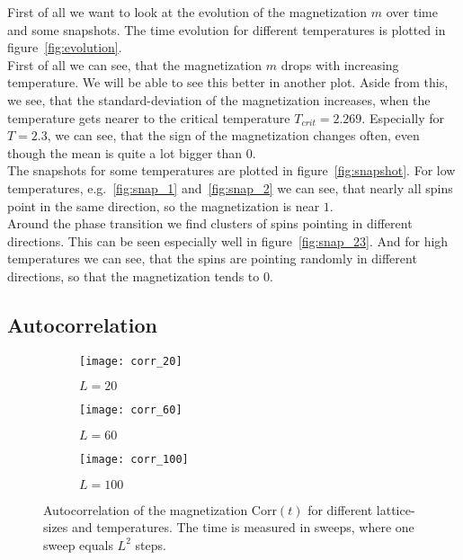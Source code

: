 First of all we want to look at the evolution of the magnetization $m$ over time and some snapshots. The time evolution for different temperatures is plotted in figure~\ref{fig:evolution}.\\
First of all we can see, that the magnetization $m$ drops with increasing temperature. We will be able to see this better in another plot. Aside from this, we see, that the standard-deviation of the magnetization increases, when the temperature gets nearer to the critical temperature $T_{crit} = 2.269$. Especially for $T = 2.3$, we can see, that the sign of the magnetization changes often, even though the mean is quite a lot bigger than $0$.\\
The snapshots for some temperatures are plotted in figure~\ref{fig:snapshot}. For low temperatures, e.g.~\ref{fig:snap_1} and~\ref{fig:snap_2} we can see, that nearly all spins point in the same direction, so the magnetization is near $1$.\\
Around the phase transition we find clusters of spins pointing in different directions. This can be seen especially well in figure~\ref{fig:snap_23}. And for high temperatures we can see, that the spins are pointing randomly in different directions, so that the magnetization tends to $0$.


\subsection{Autocorrelation}

\begin{figure}
  \begin{subfigure}{0.33\textwidth}
    \centering
    \texttt{[image: corr\_20]}
    \caption{$L = 20$}\label{fig:corr_20}
  \end{subfigure}%
  \begin{subfigure}{0.33\textwidth}
    \centering
    \texttt{[image: corr\_60]}
    \caption{$L = 60$}\label{fig:corr_60}
  \end{subfigure}%
  \begin{subfigure}{0.33\textwidth}
    \centering
    \texttt{[image: corr\_100]}
    \caption{$L = 100$}\label{fig:corr_100}
  \end{subfigure}%
  \caption{Autocorrelation of the magnetization Corr$(t)$ for different lattice-sizes and temperatures. The time is measured in sweeps, where one sweep equals $L^2$ steps.}\label{fig:corr}
\end{figure}
